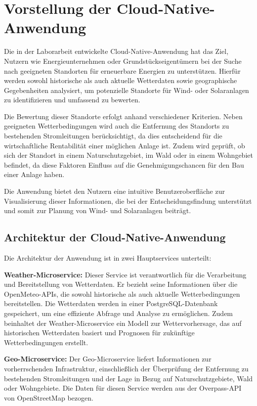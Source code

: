 
\chapter{Vorstellung der Cloud-Native-Anwendung}
Die in der Laborarbeit entwickelte Cloud-Native-Anwendung hat das Ziel, Nutzern wie Energieunternehmen oder Grundstückseigentümern bei der Suche nach geeigneten Standorten für erneuerbare Energien zu unterstützen. Hierfür werden sowohl historische als auch aktuelle Wetterdaten sowie geographische Gegebenheiten analysiert, um potenzielle Standorte für Wind- oder Solaranlagen zu identifizieren und umfassend zu bewerten.

Die Bewertung dieser Standorte erfolgt anhand verschiedener Kriterien. Neben geeigneten Wetterbedingungen wird auch die Entfernung des Standorts zu bestehenden Stromleitungen berücksichtigt, da dies entscheidend für die wirtschaftliche Rentabilität einer möglichen Anlage ist. Zudem wird geprüft, ob sich der Standort in einem Naturschutzgebiet, im Wald oder in einem Wohngebiet befindet, da diese Faktoren Einfluss auf die Genehmigungschancen für den Bau einer Anlage haben.

Die Anwendung bietet den Nutzern eine intuitive Benutzeroberfläche zur Visualisierung dieser Informationen, die bei der Entscheidungsfindung unterstützt und somit zur Planung von Wind- und Solaranlagen beiträgt.

\section{Architektur der Cloud-Native-Anwendung}
Die Architektur der Anwendung ist in zwei Hauptservices unterteilt:

\textbf{Weather-Microservice:} Dieser Service ist verantwortlich für die Verarbeitung und Bereitstellung von Wetterdaten. Er bezieht seine Informationen über die OpenMeteo-APIs, die sowohl historische als auch aktuelle Wetterbedingungen bereitstellen. Die Wetterdaten werden in einer PostgreSQL-Datenbank gespeichert, um eine effiziente Abfrage und Analyse zu ermöglichen. Zudem beinhaltet der Weather-Microservice ein Modell zur Wettervorhersage, das auf historischen Wetterdaten basiert und Prognosen für zukünftige Wetterbedingungen erstellt.

\textbf{Geo-Microservice:} Der Geo-Microservice liefert Informationen zur vorherrschenden Infrastruktur, einschließlich der Überprüfung der Entfernung zu bestehenden Stromleitungen und der Lage in Bezug auf Naturschutzgebiete, Wald oder Wohngebiete. Die Daten für diesen Service werden aus der Overpass-API von OpenStreetMap bezogen.

